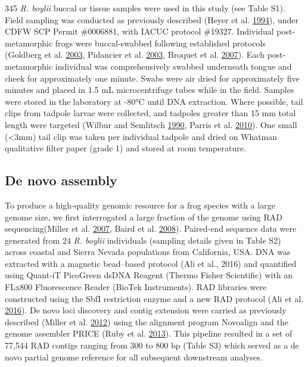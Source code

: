 \documentclass[proquest,12pt,final]{ucthesis-CA2012} %
\begin{document}
\begin{ucmainmatter}
345 \emph{R. boylii} buccal or tissue samples were used in this study
(see Table S1). Field sampling was conducted as previously described
(Heyer et al. \protect\hyperlink{ref-heyer_measuring_1994}{1994}), under
CDFW SCP Permit \#0006881, with IACUC protocol \#19327. Individual
post-metamorphic frogs were buccal-swabbed following established
protocols (Goldberg et al.
\protect\hyperlink{ref-goldberg_frogs_2003}{2003}, Pidancier et al.
\protect\hyperlink{ref-pidancier_buccal_2003}{2003}, Broquet et al.
\protect\hyperlink{ref-broquet_buccal_2007}{2007}). Each
post-metamorphic individual was comprehensively swabbed underneath
tongue and cheek for approximately one minute. Swabs were air dried for
approximately five minutes and placed in 1.5 mL microcentrifuge tubes
while in the field. Samples were stored in the laboratory at -80°C until
DNA extraction. Where possible, tail clips from tadpole larvae were
collected, and tadpoles greater than 15 mm total length were targeted
(Wilbur and Semlitsch
\protect\hyperlink{ref-wilbur_ecological_1990}{1990}, Parris et al.
\protect\hyperlink{ref-parris_assessing_2010}{2010}). One small
(\textless{}3mm) tail clip was taken per individual tadpole and dried on
Whatman qualitative filter paper (grade 1) and stored at room
temperature.

\hypertarget{de-novo-assembly}{%
\subsection{De novo assembly}\label{de-novo-assembly}}

To produce a high-quality genomic resource for a frog species with a
large genome size, we first interrogated a large fraction of the genome
using RAD sequencing(Miller et al.
\protect\hyperlink{ref-miller_rapid_2007}{2007}, Baird et al.
\protect\hyperlink{ref-baird_rapid_2008}{2008}). Paired-end sequence
data were generated from 24 \emph{R. boylii} individuals (sampling
details given in Table S2) across coastal and Sierra Nevada populations
from California, USA. DNA was extracted with a magnetic bead--based
protocol (Ali et al., 2016) and quantified using Quant-iT PicoGreen
dsDNA Reagent (Thermo Fisher Scientific) with an FLx800 Fluorescence
Reader (BioTek Instruments). RAD libraries were constructed using the
SbfI restriction enzyme and a new RAD protocol (Ali et al.
\protect\hyperlink{ref-ali_rad_2016}{2016}). De novo loci discovery and
contig extension were carried as previously described (Miller et al.
\protect\hyperlink{ref-miller_conserved_2012}{2012}) using the alignment
program Novoalign and the genome assembler PRICE (Ruby et al.
\protect\hyperlink{ref-ruby_price_2013}{2013}). This pipeline resulted
in a set of 77,544 RAD contigs ranging from 300 to 800 bp (Table S3)
which served as a de novo partial genome reference for all subsequent
downstream analyses.


\end{ucmainmatter}
\end{document}
